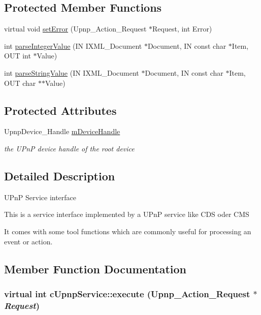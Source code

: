 \subsection*{Protected Member Functions}
\begin{CompactItemize}
\item 
virtual void \hyperlink{classcUpnpService_f0976057350505eca781aafcaf6b1d14}{setError} (Upnp\_\-Action\_\-Request $\ast$Request, int Error)
\item 
int \hyperlink{classcUpnpService_846cd44a1c014395278c3af339122656}{parseIntegerValue} (IN IXML\_\-Document $\ast$Document, IN const char $\ast$Item, OUT int $\ast$Value)
\item 
int \hyperlink{classcUpnpService_925b7a9628230ce69b803afb8fee212f}{parseStringValue} (IN IXML\_\-Document $\ast$Document, IN const char $\ast$Item, OUT char $\ast$$\ast$Value)
\end{CompactItemize}
\subsection*{Protected Attributes}
\begin{CompactItemize}
\item 
\hypertarget{classcUpnpService_359ba19926aab21f7a2e3c77ffc7f7ea}{
UpnpDevice\_\-Handle \hyperlink{classcUpnpService_359ba19926aab21f7a2e3c77ffc7f7ea}{mDeviceHandle}}
\label{classcUpnpService_359ba19926aab21f7a2e3c77ffc7f7ea}

\begin{CompactList}\small\item\em the UPnP device handle of the root device \item\end{CompactList}\end{CompactItemize}


\subsection{Detailed Description}
UPnP Service interface

This is a service interface implemented by a UPnP service like CDS oder CMS

It comes with some tool functions which are commonly useful for processing an event or action. 

\subsection{Member Function Documentation}
\hypertarget{classcUpnpService_bbffca233e6aa193eda223cb7bfc2917}{
\subsubsection[{execute}]{\setlength{\rightskip}{0pt plus 5cm}virtual int cUpnpService::execute (Upnp\_\-Action\_\-Request $\ast$ {\em Request})}}
\label{classcUpnpService_bbffca233e6aa193eda223cb7bfc2917}


